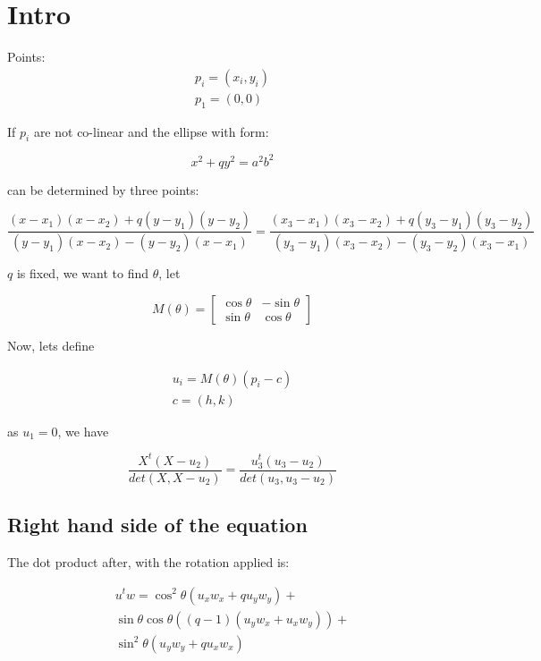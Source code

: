 \documentclass{article}
\newcommand{\detE}[6]{\dfrac{(#5-#1)(#5 - #3) + q(#6-#2)(#6-#4)}{(#6-#2)(#5-#3)-(#6-#4)(#5-#1)}}
\begin{document}
\section{Intro}

	Points:
\begin{equation}
\begin{split}
	p_i = (x_i, y_i)\\
	p_1 = (0,0)
\end{split}
\end{equation}

If $p_i$ are not co-linear and the ellipse with form:

\begin{equation}
x^2 + qy^2 = a^2b^2
\end{equation}

can be determined by three points:

\begin{equation}\label{eq:eq1}
\detE{x_1}{y_1}{x_2}{y_2}{x}{y} = 	\detE{x_1}{y_1}{x_2}{y_2}{x_3}{y_3}
\end{equation}

$q$ is fixed, we want to find $\theta$, let

\begin{equation}
M(\theta) = \left[\begin{array}{cc} \cos{\theta} & -\sin{\theta}\\ \sin{\theta} & \cos{\theta}\end{array}\right]
\end{equation}

Now, lets define

\begin{eqnarray}
u_i = M(\theta)(p_i-c)\\
c=(h,k)
\end{eqnarray}

as $u_1=0$, we have

\begin{equation}
\dfrac{X^t(X-u_2)}{det(X, X-u_2)} = \dfrac{u_3^t(u_3-u_2)}{det(u_3, u_3-u_2)}
\end{equation}

\subsection{Right hand side of the equation}

The dot product after, with the rotation applied is:

\begin{align*}
u^tw = \cos^2{\theta}(u_xw_x + qu_yw_y)+\\
\sin{\theta}\cos{\theta}((q-1)(u_yw_x+u_xw_y))+\\
\sin^2{\theta}(u_yw_y + qu_xw_x)
\end{align*}
\end{document}
